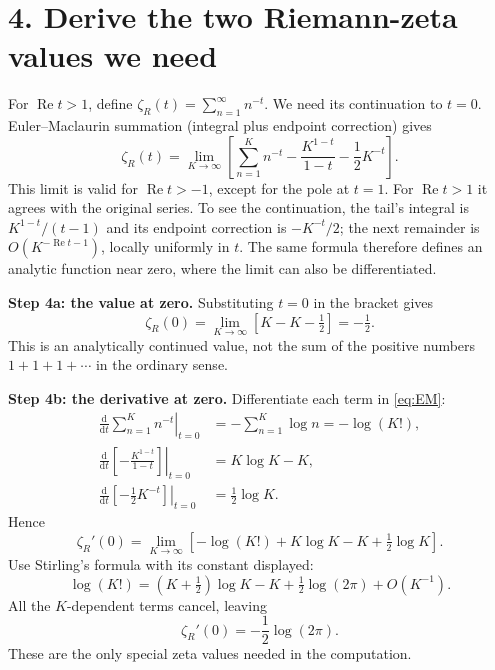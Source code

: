 \documentclass[11pt,letterpaper]{article}
\newcommand{\dd}{\mathrm{d}}
\begin{document}
\newpage
\section*{4. Derive the two Riemann-zeta values we need}
For $\operatorname{Re}t>1$, define
$\zeta_R(t)=\sum_{n=1}^{\infty}n^{-t}$. We need its continuation to $t=0$.
Euler--Maclaurin summation (integral plus endpoint correction) gives
\begin{equation}
 \zeta_R(t)=\lim_{K\to\infty}\left[
 \sum_{n=1}^{K}n^{-t}-\frac{K^{1-t}}{1-t}-\frac12K^{-t}\right].
 \label{eq:EM}
\end{equation}
This limit is valid for $\operatorname{Re}t>-1$, except for the pole at $t=1$.
For $\operatorname{Re}t>1$ it agrees with the original series. To see the
continuation, the tail's integral is $K^{1-t}/(t-1)$ and its endpoint
correction is $-K^{-t}/2$; the next remainder is $O(K^{-\operatorname{Re}t-1})$,
locally uniformly in $t$. The same formula therefore defines an analytic
function near zero, where the limit can also be differentiated.

\textbf{Step 4a: the value at zero.} Substituting $t=0$ in the bracket gives
\begin{equation}
 \boxed{\zeta_R(0)=\lim_{K\to\infty}[K-K-\tfrac12]=-\tfrac12.}
\end{equation}
This is an analytically continued value, not the sum of the positive numbers
$1+1+1+\cdots$ in the ordinary sense.

\textbf{Step 4b: the derivative at zero.} Differentiate each term in
\eqref{eq:EM}:
\begin{align*}
 \left.\frac{\dd}{\dd t}\sum_{n=1}^{K}n^{-t}\right|_{t=0}
 &=-\sum_{n=1}^{K}\log n=-\log(K!),\\
 \left.\frac{\dd}{\dd t}\left[-\frac{K^{1-t}}{1-t}\right]\right|_{t=0}
 &=K\log K-K,\\
 \left.\frac{\dd}{\dd t}\left[-\tfrac12K^{-t}\right]\right|_{t=0}
 &=\tfrac12\log K.
\end{align*}
Hence
\[
 \zeta_R'(0)=\lim_{K\to\infty}
 [-\log(K!)+K\log K-K+\tfrac12\log K].
\]
Use Stirling's formula with its constant displayed:
\[
 \log(K!)=(K+\tfrac12)\log K-K+\tfrac12\log(2\pi)+O(K^{-1}).
\]
All the $K$-dependent terms cancel, leaving
\begin{equation}
 \boxed{\zeta_R'(0)=-\frac12\log(2\pi).}
\end{equation}
These are the only special zeta values needed in the computation.

\newpage
\end{document}
